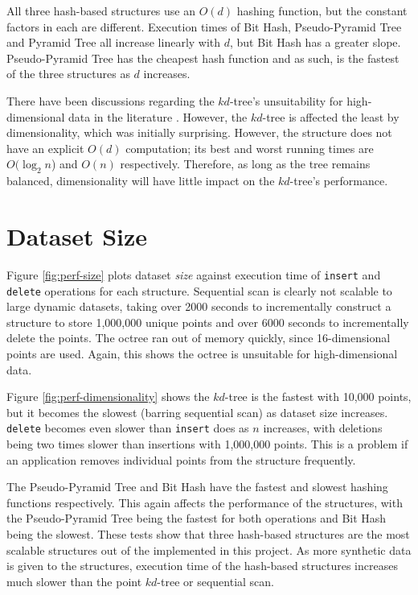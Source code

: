 All three hash-based structures use an $O(d)$ hashing function, but the constant factors in each are different. Execution times of Bit Hash, Pseudo-Pyramid Tree and Pyramid Tree all increase linearly with $d$, but Bit Hash has a greater slope. Pseudo-Pyramid Tree has the cheapest hash function and as such, is the fastest of the three structures as $d$ increases.

There have been discussions regarding the $kd$-tree's unsuitability for high-dimensional data in the literature \cite{highd-nn, search-highd-analysis}. However, the $kd$-tree is affected the least by dimensionality, which was initially surprising. However, the structure does not have an explicit $O(d)$ computation; its best and worst running times are $O(\log_2 n$) and $O(n)$ respectively. Therefore, as long as the tree remains balanced, dimensionality will have little impact on the $kd$-tree's performance.

\section{Dataset Size}

Figure \ref{fig:perf-size} plots dataset \textit{size} against execution time of \texttt{insert} and \texttt{delete} operations for each structure. Sequential scan is clearly not scalable to large dynamic datasets, taking over 2000 seconds to incrementally construct a structure to store 1,000,000 unique points and over 6000 seconds to incrementally delete the points. The octree ran out of memory quickly, since 16-dimensional points are used. Again, this shows the octree is unsuitable for high-dimensional data.

Figure \ref{fig:perf-dimensionality} shows the $kd$-tree is the fastest with 10,000 points, but it becomes the slowest (barring sequential scan) as dataset size increases. \texttt{delete} becomes even slower than \texttt{insert} does as $n$ increases, with deletions being two times slower than insertions with 1,000,000 points. This is a problem if an application removes individual points from the structure frequently.

The Pseudo-Pyramid Tree and Bit Hash have the fastest and slowest hashing functions respectively. This again affects the performance of the structures, with the Pseudo-Pyramid Tree being the fastest for both operations and Bit Hash being the slowest. These tests show that three hash-based structures are the most scalable structures out of the implemented in this project. As more synthetic data is given to the structures, execution time of the hash-based structures increases much slower than the point $kd$-tree or sequential scan.


